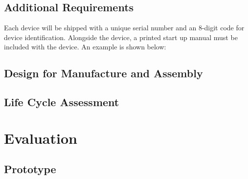 \documentclass{article}
\begin{document}



















\subsection{Additional Requirements}
Each device will be shipped with a unique serial number and an 8-digit code for device identification.
Alongside the device, a printed start up manual must be included with the device. An example is shown below:


\newpage

\subsection{Design for Manufacture and Assembly}

\subsection{Life Cycle Assessment}


\newpage

\section{Evaluation} \label{eval}

\subsection{Prototype}



\end{document}
